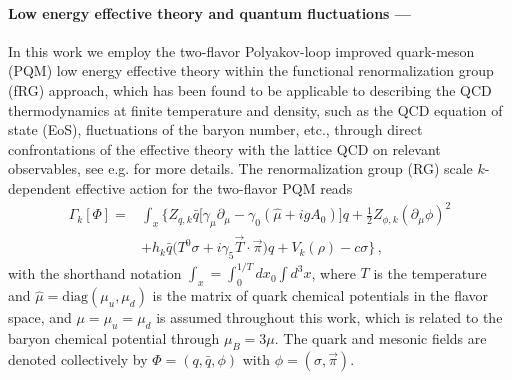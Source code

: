 \documentclass[%
reprint,
superscriptaddress,
showpacs,preprintnumbers,
 amsmath,amssymb,
 aps,
prl,
]{revtex4-1}
\begin{document}
\paragraph*{Low energy effective theory and quantum fluctuations ---\!\!\!}
\label{sec:LEFT}

In this work we employ the two-flavor Polyakov-loop improved quark-meson (PQM) low energy effective theory within the functional renormalization group (fRG) approach, which has been found to be applicable to describing the QCD thermodynamics at finite temperature and density, such as the QCD equation of state (EoS), fluctuations of the baryon number, etc., through direct confrontations of the effective theory with the lattice QCD on relevant observables, see e.g. \cite{Schaefer:2004en,Skokov:2010wb,Haas:2013qwp,Herbst:2013ufa,Fu:2015naa,Fu:2016tey} for more details. The renormalization group (RG) scale $k$-dependent effective action for the two-flavor PQM reads
\begin{align}
  \Gamma_k[\Phi]=&\int_x \bigg\{Z_{q,k}\bar{q} \Big [\gamma_\mu \partial_\mu -\gamma_0(\hat\mu+igA_0) \Big ]q+\frac{1}{2}Z_{\phi,k}(\partial_\mu \phi)^2 \nonumber\\[2ex]
  &+h_k\bar{q}\big(T^0\sigma+i\gamma_5\vec{T}\cdot \vec{\pi}\big)q+V_k(\rho)-c\sigma \bigg\}\,,
\label{eq:action}
\end{align}
with the shorthand notation $\int_x=\int^{1/T}_0dx_0\int d^3x$, where $T$ is the temperature and $\hat\mu=\mathrm{diag}(\mu_u,\mu_d)$ is the matrix of quark chemical potentials in the flavor space, and $\mu=\mu_u=\mu_d$ is assumed throughout this work, which is related to the baryon chemical potential through $\mu_B=3\mu$. The quark and mesonic fields are denoted collectively by $\Phi=(q, \bar q, \phi)$ with $\phi=(\sigma,\vec{\pi})$.
\end{document}
